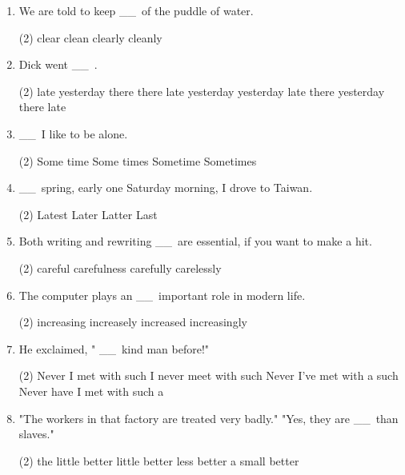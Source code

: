\documentclass{yufa}
\newcommand\ttu{ \_\_\ }
\begin{document}
\begin{enumerate}
\item We are told to keep \ttu of the puddle of water.
  \begin{tasks}(2)
    \task clear
    \task clean
    \task clearly
    \task cleanly
  \end{tasks}

\item Dick went \ttu.
  \begin{tasks}(2)
    \task late yesterday there
    \task there late yesterday
    \task yesterday late there
    \task yesterday there late
  \end{tasks}

\item \ttu I like to be alone.
  \begin{tasks}(2)
    \task Some time
    \task Some times
    \task Sometime
    \task Sometimes
  \end{tasks}

\item \ttu spring, early one Saturday morning, I drove to Taiwan.
  \begin{tasks}(2)
    \task Latest
    \task Later
    \task Latter
    \task Last
  \end{tasks}

\item Both writing and rewriting \ttu are essential, if you want to make a hit.
  \begin{tasks}(2)
    \task careful
    \task carefulness
    \task carefully
    \task carelessly
  \end{tasks}

\item The computer plays an \ttu important role in modern life.
  \begin{tasks}(2)
    \task increasing
    \task increasely
    \task increased
    \task increasingly
  \end{tasks}

\item He exclaimed, "\ttu kind man before!"
  \begin{tasks}(2)
    \task Never I met with such
    \task I never meet with such
    \task Never I've met with a such
    \task Never have I met with such a
  \end{tasks}

\item "The workers in that factory are treated very badly." "Yes, they are \ttu than slaves."
  \begin{tasks}(2)
    \task the little better
    \task little better
    \task less better
    \task a small better
  \end{tasks}


\end{enumerate}
\end{document}
